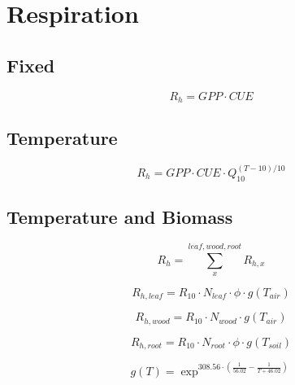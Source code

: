 \chapter{Respiration}

\section{Fixed}

\begin{equation}
	R_{h} = GPP \cdot CUE
\end{equation}

\section{Temperature}

\begin{equation}
	R_{h} = GPP \cdot CUE \cdot Q_{10}^{(T-10)/10}
\end{equation}

\section{Temperature and Biomass}

\begin{equation}
	R_{h} = \sum_{x}^{leaf,wood,root} R_{h,x}
\end{equation}

\begin{equation}
	R_{h,leaf} = R_{10} \cdot N_{leaf} \cdot \phi \cdot g(T_{air})
\end{equation}

\begin{equation}
	R_{h,wood} = R_{10} \cdot N_{wood} \cdot g(T_{air})
\end{equation}

\begin{equation}
	R_{h,root} = R_{10} \cdot N_{root} \cdot \phi \cdot g(T_{soil})
\end{equation}

\begin{equation}
	g(T) = \exp^{308.56 \cdot (\frac{1}{56.02} - \frac{1}{T + 46.02})}
\end{equation}
